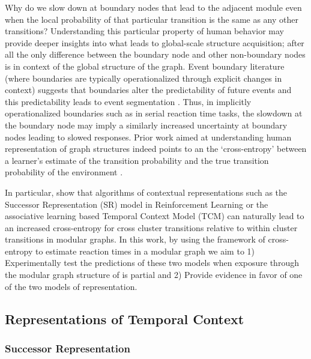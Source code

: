 Why do we slow down at boundary nodes that lead to the adjacent module even when the local probability of that particular transition is the same as any other transitions? Understanding this particular property of human behavior may provide deeper insights into what leads to global-scale structure acquisition; after all the only difference between the boundary node and other non-boundary nodes is in context of the global structure of the graph. Event boundary literature (where boundaries are typically operationalized through explicit changes in context) suggests that boundaries alter the predictability of future events and this predictability leads to event segmentation \cite{zacks2007event, clewett2019transcending}. Thus, in implicitly operationalized boundaries such as in serial reaction time tasks, the slowdown at the boundary node may imply a similarly increased uncertainty at boundary nodes leading to slowed responses. Prior work aimed at understanding human representation of graph structures indeed points to an the `cross-entropy' between a learner's estimate of the transition probability and the true transition probability of the environment \cite{lynn2020abstract, lynn2020humans, lynn2020human}. 


In particular, \cite{lynn2020human} show that algorithms of contextual representations such as the Successor Representation (SR) model in Reinforcement Learning \cite{dayan1993improving, momennejad2017successor, gershman2018successor} or the associative learning based Temporal Context Model (TCM) can naturally lead to an increased cross-entropy for cross cluster transitions relative to within cluster transitions in modular graphs. In this work, by using the framework of cross-entropy to estimate reaction times in a modular graph we aim to 1) Experimentally test the predictions of these two models when exposure through the modular graph structure of is partial and 2) Provide evidence in favor of one of the two models of representation. 

\subsection{Representations of Temporal Context}

\subsubsection{Successor Representation}\label{successor-representation}

